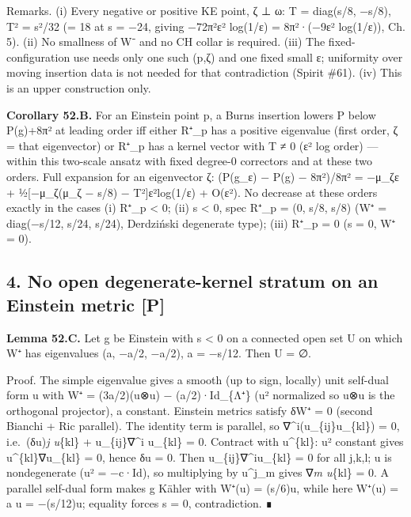 \documentclass[
  10pt,
]{report}
\begin{document}
Remarks. (i) Every negative or positive KE point, ζ ⊥ ω: T = diag(s/8,
−s/8), \textbar T\textbar² = s²/32 (= 18 at s = −24, giving −72π²ε²
log(1/ε) = 8π²·(−9ε² log(1/ε)), Ch. 5). (ii) No smallness of W⁻ and no
CH collar is required. (iii) The fixed-configuration use needs only one
such (p,ζ) and one fixed small ε; uniformity over moving insertion data
is not needed for that contradiction (Spirit \#61). (iv) This is an
upper construction only.

\textbf{Corollary 52.B.} For an Einstein point p, a Burns insertion
lowers P below P(g)+8π² at leading order iff either R⁺\_p has a positive
eigenvalue (first order, ζ = that eigenvector) or R⁺\_p has a kernel
vector with T ≠ 0 (ε² log order) --- within this two-scale ansatz with
fixed degree-0 correctors and at these two orders. Full expansion for an
eigenvector ζ: (P(g\_ε) − P(g) − 8π²)/8π² = −μ\_ζε + ½{[}−μ\_ζ(μ\_ζ −
s/8) − \textbar T\textbar²{]}ε²log(1/ε) + O(ε²). No decrease at these
orders exactly in the cases (i) R⁺\_p \textless{} 0; (ii) s \textless{}
0, spec R⁺\_p = (0, s/8, s/8) (W⁺ = diag(−s/12, s/24, s/24), Derdziński
degenerate type); (iii) R⁺\_p = 0 (s = 0, W⁺ = 0).

\hypertarget{no-open-degenerate-kernel-stratum-on-an-einstein-metric-p}{%
\subsection{4. No open degenerate-kernel stratum on an Einstein metric
{[}P{]}}\label{no-open-degenerate-kernel-stratum-on-an-einstein-metric-p}}

\textbf{Lemma 52.C.} Let g be Einstein with s \textless{} 0 on a
connected open set U on which W⁺ has eigenvalues (a, −a/2, −a/2), a =
−s/12. Then U = ∅.

Proof. The simple eigenvalue gives a smooth (up to sign, locally) unit
self-dual form u with W⁺ = (3a/2)(u⊗u) − (a/2)·Id\_\{Λ⁺\}
(\textbar u\textbar² normalized so u⊗u is the orthogonal projector), a
constant. Einstein metrics satisfy δW⁺ = 0 (second Bianchi + Ric
parallel). The identity term is parallel, so ∇\^{}i(u\_\{ij\}u\_\{kl\})
= 0, i.e.~(δu)\emph{j u}\{kl\} + u\_\{ij\}∇\^{}i u\_\{kl\} = 0. Contract
with u\^{}\{kl\}: \textbar u\textbar² constant gives
u\^{}\{kl\}∇u\_\{kl\} = 0, hence δu = 0. Then u\_\{ij\}∇\^{}iu\_\{kl\} =
0 for all j,k,l; u is nondegenerate (u² = −c·Id), so multiplying by
u\^{}j\_m gives ∇\emph{m u}\{kl\} = 0. A parallel self-dual form makes g
Kähler with W⁺(u) = (s/6)u, while here W⁺(u) = a u = −(s/12)u; equality
forces s = 0, contradiction. ∎
\end{document}
